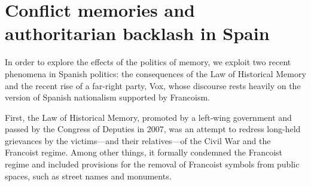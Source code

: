 \documentclass[12pt, notitlepage]{article}
\begin{document}



\section*{Conflict memories and authoritarian backlash in Spain}

In order to explore the effects of the politics of memory, we exploit two recent phenomena in Spanish politics: the consequences of the Law of Historical Memory and the recent rise of a far-right party, Vox, whose discourse rests heavily on the version of Spanish nationalism supported by Francoism.

First, the Law of Historical Memory, promoted by a left-wing government and passed by the Congress of Deputies in 2007, was an attempt to redress long-held grievances by the victims---and their relatives---of the Civil War and the Francoist regime.
Among other things, it formally condemned the Francoist regime and included provisions for the removal of Francoist symbols from public spaces, such as street names and monuments.
\end{document}
